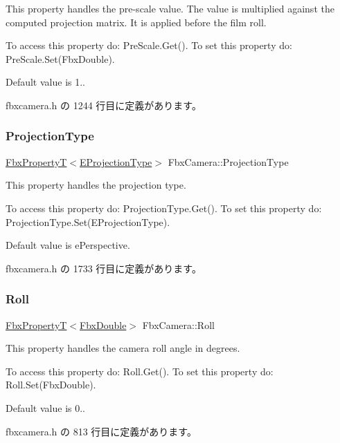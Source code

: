This property handles the pre-\/scale value. The value is multiplied against the computed projection matrix. It is applied before the film roll.

To access this property do\+: Pre\+Scale.\+Get(). To set this property do\+: Pre\+Scale.\+Set(\+Fbx\+Double).

Default value is 1.. 

 fbxcamera.\+h の 1244 行目に定義があります。

\mbox{\label{class_fbx_camera_a36af73c36f749f694ccc9eefbe88087b}} 
\subsubsection{\texorpdfstring{Projection\+Type}{ProjectionType}}
{\footnotesize\ttfamily \hyperlink{class_fbx_property_t}{Fbx\+PropertyT}$<$\hyperlink{class_fbx_camera_a717b9b0d28c8b20c115edf8c80016fb1}{E\+Projection\+Type}$>$ Fbx\+Camera\+::\+Projection\+Type}

This property handles the projection type.

To access this property do\+: Projection\+Type.\+Get(). To set this property do\+: Projection\+Type.\+Set(\+E\+Projection\+Type).

Default value is e\+Perspective. 

 fbxcamera.\+h の 1733 行目に定義があります。

\mbox{\label{class_fbx_camera_ab59a181ec24cb954e0899273caea96dc}} 
\subsubsection{\texorpdfstring{Roll}{Roll}}
{\footnotesize\ttfamily \hyperlink{class_fbx_property_t}{Fbx\+PropertyT}$<$\hyperlink{fbxtypes_8h_a171e72a1c46fc15c1a6c9c31948c1c5b}{Fbx\+Double}$>$ Fbx\+Camera\+::\+Roll}

This property handles the camera roll angle in degrees.

To access this property do\+: Roll.\+Get(). To set this property do\+: Roll.\+Set(\+Fbx\+Double).

Default value is 0.. 

 fbxcamera.\+h の 813 行目に定義があります。

